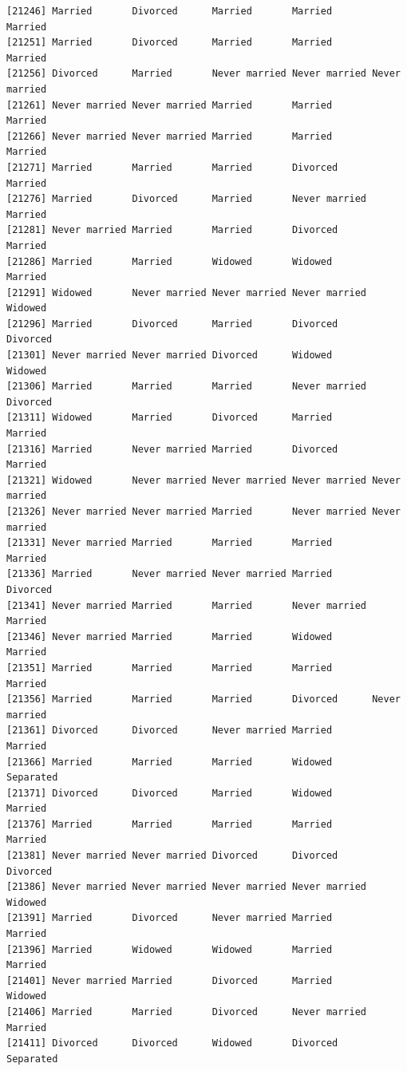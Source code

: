 \documentclass[
  letterpaper,
  DIV=11,
  numbers=noendperiod,
  oneside]{scrartcl}
\begin{document}
\begin{verbatim}
[21246] Married       Divorced      Married       Married       Married      
[21251] Married       Divorced      Married       Married       Married      
[21256] Divorced      Married       Never married Never married Never married
[21261] Never married Never married Married       Married       Married      
[21266] Never married Never married Married       Married       Married      
[21271] Married       Married       Married       Divorced      Married      
[21276] Married       Divorced      Married       Never married Married      
[21281] Never married Married       Married       Divorced      Married      
[21286] Married       Married       Widowed       Widowed       Married      
[21291] Widowed       Never married Never married Never married Widowed      
[21296] Married       Divorced      Married       Divorced      Divorced     
[21301] Never married Never married Divorced      Widowed       Widowed      
[21306] Married       Married       Married       Never married Divorced     
[21311] Widowed       Married       Divorced      Married       Married      
[21316] Married       Never married Married       Divorced      Married      
[21321] Widowed       Never married Never married Never married Never married
[21326] Never married Never married Married       Never married Never married
[21331] Never married Married       Married       Married       Married      
[21336] Married       Never married Never married Married       Divorced     
[21341] Never married Married       Married       Never married Married      
[21346] Never married Married       Married       Widowed       Married      
[21351] Married       Married       Married       Married       Married      
[21356] Married       Married       Married       Divorced      Never married
[21361] Divorced      Divorced      Never married Married       Married      
[21366] Married       Married       Married       Widowed       Separated    
[21371] Divorced      Divorced      Married       Widowed       Married      
[21376] Married       Married       Married       Married       Married      
[21381] Never married Never married Divorced      Divorced      Divorced     
[21386] Never married Never married Never married Never married Widowed      
[21391] Married       Divorced      Never married Married       Married      
[21396] Married       Widowed       Widowed       Married       Married      
[21401] Never married Married       Divorced      Married       Widowed      
[21406] Married       Married       Divorced      Never married Married      
[21411] Divorced      Divorced      Widowed       Divorced      Separated    

\end{verbatim}
\end{document}
